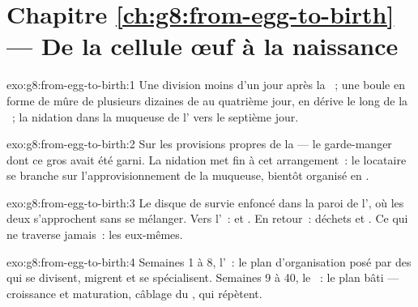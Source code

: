 \section*{Chapitre \ref{ch:g8:from-egg-to-birth} --- De la cellule œuf à la naissance}

\begin{solution}{exo:g8:from-egg-to-birth:1}
Une division moins d'un jour après la ~; une boule en
forme de mûre de plusieurs dizaines de  au quatrième jour,
en dérive le long de la ~; la nidation dans la muqueuse de
l' vers le septième jour.
\end{solution}

\begin{solution}{exo:g8:from-egg-to-birth:2}
Sur les provisions propres de la  --- le garde-manger
dont ce gros  avait été garni. La nidation met fin à cet
arrangement~: le locataire se branche sur l'approvisionnement de la
muqueuse, bientôt organisé en .
\end{solution}

\begin{solution}{exo:g8:from-egg-to-birth:3}
Le disque de survie enfoncé dans la paroi de l', où les deux
 s'approchent sans se mélanger. Vers l'~:  et
. En retour~: déchets et . Ce qui ne
traverse jamais~: les  eux-mêmes.
\end{solution}

\begin{solution}{exo:g8:from-egg-to-birth:4}
Semaines 1 à 8, l'~: le plan d'organisation posé par des
 qui se divisent, migrent et se spécialisent. Semaines 9 à
40, le ~: le plan bâti --- croissance et maturation, câblage du
,  qui répètent.
\end{solution}


